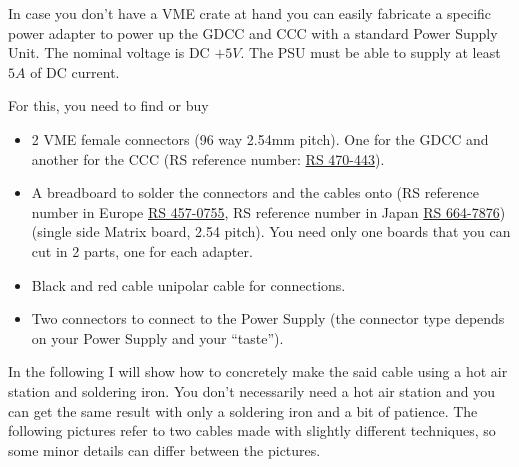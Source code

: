 In case you don't have a VME crate at hand you can easily fabricate a specific
power adapter to power up the GDCC and CCC with a standard Power Supply
Unit. The nominal voltage is DC $+5V$. The PSU must be able to supply at least
$5A$ of DC current.

For this, you need to find or buy
\begin{itemize}
\item 2 VME female connectors (96 way 2.54mm pitch). One for the GDCC and
  another for the CCC (RS reference number:
  \href{https://jp.rs-online.com/web/p/din-41612-connectors/0470443/?sra=pstk}{RS
    470-443}).
\item A breadboard to solder the connectors and the cables onto (RS reference
  number in Europe
  \href{https://uk.rs-online.com/web/p/matrix-boards/4570755/}{RS 457-0755}, RS
  reference number in Japan
  \href{https://jp.rs-online.com/web/p/matrix-boards/6647876/?sra=pstk}{RS
    664-7876}) (single side Matrix board, 2.54 pitch). You need only one boards
  that you can cut in 2 parts, one for each adapter.
\item Black and red cable unipolar cable for connections.
\item Two connectors to connect to the Power Supply (the connector type depends
  on your Power Supply and your ``taste'').
\end{itemize}

In the following I will show how to concretely make the said cable using a hot
air station and soldering iron. You don't necessarily need a hot air station and
you can get the same result with only a soldering iron and a bit of
patience. The following pictures refer to two cables made with slightly
different techniques, so some minor details can differ between the pictures.

